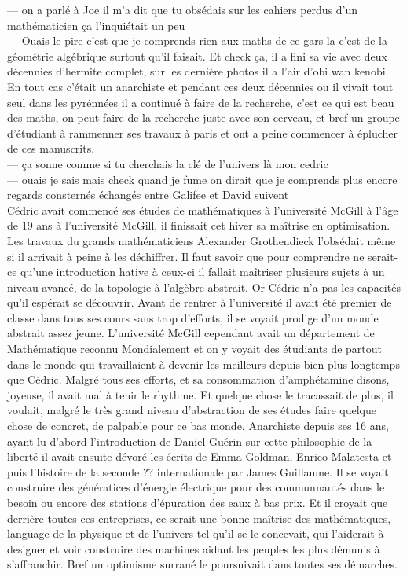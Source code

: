 \documentclass{article}
\begin{document}
---  on a parlé  à Joe il m'a dit que tu obsédais sur les cahiers perdus d'un mathématicien
ça l'inquiétait un peu\\
--- Ouais le pire c'est que je comprends rien aux maths de ce gars la c'est de la géométrie algébrique
surtout qu'il faisait. Et check ça, il a fini sa vie avec deux décennies d'hermite complet, sur les
dernière photos il a l'air d'obi wan kenobi. En tout cas c'était un anarchiste et pendant ces
deux décennies ou il vivait tout seul dans les pyrénnées il a continué à faire de la recherche,
c'est ce qui est beau des maths, on peut faire de la recherche juste avec son cerveau, et bref
un groupe d'étudiant à rammenner ses travaux à paris et ont a peine commencer à
éplucher de ces manuscrits.\\
--- ça sonne comme si tu cherchais la clé de l'univers là mon cedric\\
--- ouais je sais mais check quand je fume on dirait que je comprends plus encore\\

regards consternés échangés entre Galifee et David suivent\\



Cédric avait commencé ses études de mathématiques à l'université McGill à l'âge
de 19 ans à l'université McGill, il finissait cet hiver sa maîtrise en
optimisation. Les travaux du grands mathématiciens Alexander Grothendieck
l'obsédait même si il arrivait à peine à les déchiffrer. Il faut savoir
que pour comprendre ne serait-ce qu'une introduction hative à ceux-ci il fallait
maîtriser plusieurs sujets à un niveau avancé, de la topologie à l'algèbre
abstrait. Or Cédric n'a pas les capacités qu'il espérait se découvrir. Avant de
rentrer à l'université il avait été premier de classe dans tous ses cours sans
trop d'efforts, il se voyait prodige d'un monde abstrait assez jeune.
L'université McGill cependant avait un département de Mathématique reconnu
Mondialement et on y voyait des étudiants de partout dans le monde qui
travaillaient à devenir les meilleurs depuis bien plus longtemps que Cédric.
Malgré tous ses efforts, et sa consommation d'amphétamine disons, joyeuse, il avait
mal à tenir le rhythme. Et quelque chose le tracassait de plus, il voulait,
malgré le très grand niveau d'abstraction de ses études faire quelque chose de
concret, de palpable pour ce bas monde. Anarchiste depuis ses 16 ans, ayant lu
d'abord l'introduction de Daniel Guérin sur cette philosophie de la liberté il
avait ensuite dévoré les écrits de Emma Goldman, Enrico Malatesta et puis
l'histoire de la seconde ?? internationale par James Guillaume. Il se voyait
construire des génératices d'énergie électrique pour des communnautés dans le
besoin ou encore des stations d'épuration des eaux à bas prix. Et il croyait que
derrière toutes ces entreprises, ce serait une bonne maîtrise des mathématiques,
language de la physique et de l'univers tel qu'il se le concevait, qui
l'aiderait à designer et voir construire des machines aidant les peuples les
plus démunis à s'affranchir. Bref un optimisme surrané le poursuivait dans
toutes ses démarches.\\
\end{document}
